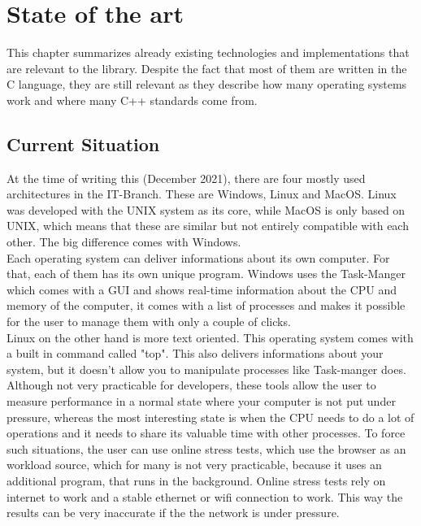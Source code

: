 \chapter{State of the art}
This chapter summarizes already existing technologies and implementations that are relevant to the library. Despite the fact that most of them are written in the C language, they are still relevant as they describe how many operating systems work and where many C++ standards come from.   
\section{Current Situation} 
At the time of writing this (December 2021), there are four mostly used architectures in the IT-Branch. These are Windows, Linux and MacOS. Linux was developed with the UNIX system as its core, while MacOS is only based on UNIX, which means that these are similar but not entirely compatible with each other. The big difference comes with Windows.\\
Each operating system can deliver informations about its own computer.
For that, each of them has its own unique program. Windows uses the \dq Task-Manger\dq{} which comes with a GUI and shows real-time information about the CPU and memory of the computer, it comes with a list of processes and makes it possible for the user to manage them with only a couple of clicks.\\
Linux on the other hand is more text oriented. This operating system comes with a built in command called "top". This also delivers informations about your system, but it doesn't allow you to manipulate processes like \dq Task-manger\dq{} does. Although not very practicable for developers, these tools allow the user to measure performance in a normal state where your computer is not put under pressure, whereas the most interesting state is when the CPU needs to do a lot of operations and it needs to share its valuable time with other processes. To force such situations, the user can use online stress tests, which use the browser as an workload source, which for many is not very practicable, because it uses an additional program, that runs in the background. Online stress tests rely on internet to work and a stable ethernet or wifi connection to work. This way the results can be very inaccurate if the the network is under pressure.
